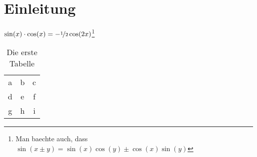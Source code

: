 
\chapter{Einleitung}

\blindtext$\sin(x)\cdot\cos(x) = -\nicefrac{1}{2} \cos(2x)$\footnote{Man baechte auch, dass $\sin(x\pm y) = \sin(x)\cos(y) \pm \cos(x)\sin(y)$}

\begin{table}[h]
  \centering
  \begin{tabular}{ccc}
    \toprule
    a & b & c\\
    d & e & f\\
    g & h & i\\
    \bottomrule
  \end{tabular}
  \caption{Die erste Tabelle}
  \label{tabelle1}
\end{table}